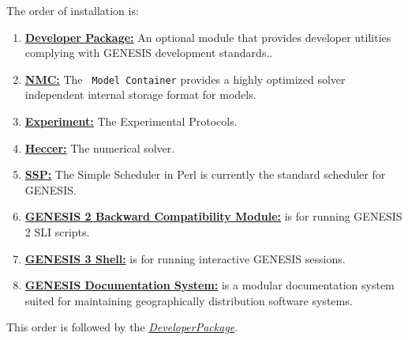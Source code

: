 \documentclass[12pt]{article}
\begin{document}
The order of installation is:
\begin{enumerate}
\item \href{../developer-package/developer-package.tex}{\bf Developer
    Package:} An optional module that provides developer utilities
  complying with GENESIS development standards..
\item \href{../model-container/model-container.tex}{\bf NMC:} The {\tt
    Model Container} provides a highly optimized solver independent
  internal storage format for models.
\item \href{../experiment/experiment.tex}{\bf Experiment:} The
  Experimental Protocols.
\item \href{../heccer/heccer.tex}{\bf Heccer:} The numerical solver.
\item \href{../ssp/ssp.tex}{\bf SSP:} The Simple Scheduler in Perl is
  currently the standard scheduler for GENESIS.
\item \href{../backward-compatibility/backward-compatibility.tex}{\bf
    GENESIS 2 Backward Compatibility Module:} is for running GENESIS 2
  SLI scripts.
\item \href{../gshell/gshell.tex}{\bf GENESIS 3 Shell:} is for running
  interactive GENESIS sessions.
\item \href{../documentation-overview/documentation-overview.tex}{\bf
    GENESIS Documentation System:} is a modular documentation system
  suited for maintaining geographically distribution software systems.
\end{enumerate} 

This order is followed by the \href{../developer_package/developer_package.tex}{\it DeveloperPackage}.



\end{document}
